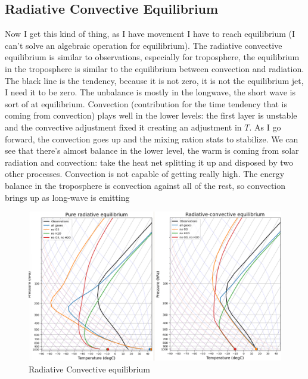 \subsection{Radiative Convective Equilibrium}
Now I get this kind of thing, as I have movement I have to reach equilibrium (I can't solve an algebraic operation for equilibrium). The radiative convective equilibrium is similar to observations, especially for troposphere, the equilibrium in the troposphere is similar to the equilibrium between convection and radiation. The black line is the tendency, because it is not zero, it is not the equilibrium jet, I need it to be zero. The unbalance is mostly in the longwave, the short wave is sort of at equilibrium. Convection (contribution for the time tendency that is coming from convection) plays well in the lower levels: the first layer is unstable and the convective adjustment fixed it creating an adjustment in $T$. As I go forward, the convection goes up and the mixing ration stats to stabilize. We can see that there's almost balance in the lower level, the warm is coming from solar radiation and convection: take the heat net splitting it up and disposed by two other processes. Convection is not capable of getting really high. The energy balance in the troposphere is convection against all of the rest, so convection brings up as long-wave is emitting 
\begin{figure}[h!]
    \centering
    \includegraphics[width=0.5\linewidth]{uploads/Screenshot 2024-11-20 131319.png}
    \caption{Radiative Convective equilibrium}
    \label{fig:enter-label}
\end{figure}